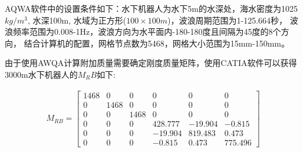 \begin{figure}
\label{fig:chap4:F3}
\centering
{}
\end{figure}


AQWA软件中的设置条件如下：水下机器人为水下5m的水深处，海水密度为1025$kg/m^3$, 水深100m, 水域为正方形($100\times100m$)，波浪周期范围为1-125.664秒， 波浪频率范围为0.008-1Hz，波浪方向为水平面内-180-180度且间隔为45度的8个方向， 结合计算机的配置，网格节点数为5468，网格大小范围为15mm-150mm。

由于使用AWQA计算附加质量需要确定刚度质量矩阵，使用CATIA软件可以获得3000m水下机器人的$M_RB$如下:

\begin{equation}
\begin{aligned}
M_{RB} = \begin{bmatrix}
   1468&0   &0   &0&0&0 \\
     0 &1468&0   &0&0&0 \\
     0 &0   &1468&0&0&0 \\
     0 &0   &0   &428.777 &-19.904 &-0.815\\
     0 &0   &0   &-19.904&819.483 &0.473  \\
     0 &0   &0   &-0.815 &0.473   &775.496
         \end{bmatrix}
\end{aligned}
\end{equation}

